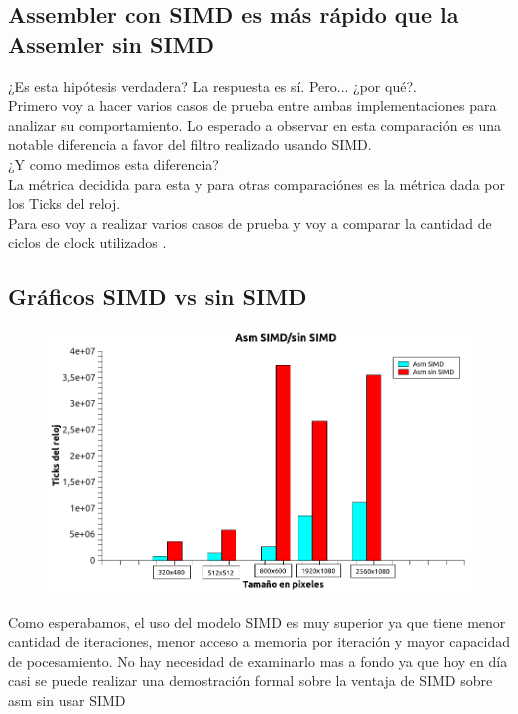 \subsection{Assembler con SIMD es más rápido que la Assemler sin SIMD}

¿Es esta hipótesis verdadera? La respuesta es sí. Pero... ¿por qué?. \\
Primero voy a hacer varios casos de prueba entre ambas implementaciones para analizar su comportamiento. Lo esperado a observar en esta comparación es una notable diferencia a favor del filtro realizado usando SIMD.\\
¿Y como medimos esta diferencia?\\
 La métrica decidida para esta y para otras comparaciónes es la métrica dada por los Ticks del reloj.\\
 Para eso voy a realizar varios casos de prueba y voy a comparar la cantidad de ciclos de clock utilizados .\\

 \subsection{Gráficos SIMD vs sin SIMD}



 \begin{figure}[H]
\begin{center}
  \includegraphics[width=\linewidth]{diffsinsimd/simdSinSIMD.png}
\end{center}
\end{figure}

 Como esperabamos, el uso del modelo SIMD es muy superior ya que tiene menor cantidad de iteraciones, menor acceso a memoria por iteración y mayor capacidad de pocesamiento. No hay necesidad de examinarlo mas a fondo ya que hoy en día casi se puede realizar una demostración formal sobre la ventaja de SIMD sobre asm sin usar SIMD\\
